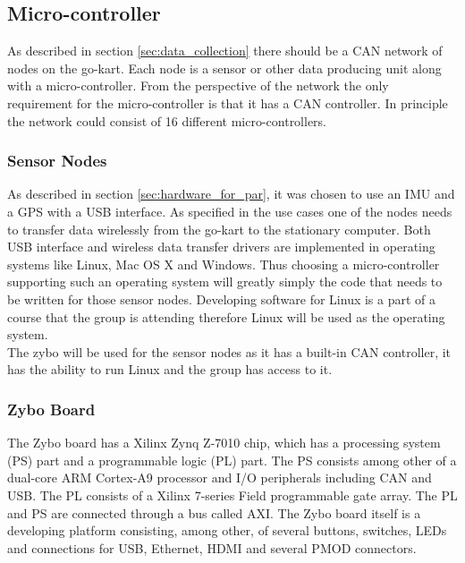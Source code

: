 
\subsection{Micro-controller}
As described in section \ref{sec:data_collection} there should be a CAN network of nodes on the go-kart.
Each node is a sensor or other data producing unit along with a micro-controller.
From the perspective of the network the only requirement for the micro-controller is that it has a CAN controller.
In principle the network could consist of 16 different micro-controllers.
\subsubsection*{Sensor Nodes}
As described in section \ref{sec:hardware_for_par}, it was chosen to use an IMU and a GPS with a USB interface. 
As specified in the use cases one of the nodes needs to transfer data wirelessly from the go-kart to the stationary computer. 
Both USB interface and wireless data transfer drivers are implemented in operating systems like Linux, Mac OS X and Windows.
Thus choosing a micro-controller supporting such an operating system will greatly simply the code that needs to be written for those sensor nodes.
Developing software for Linux is a part of a course that the group is attending therefore Linux will be used as the operating system.
\\
The \ac{zybo} will be used for the sensor nodes as it has a built-in CAN controller, it has the ability to run Linux and the group has access to it.

\subsubsection*{Zybo Board}
The Zybo board has a Xilinx Zynq Z-7010 chip, which has a processing system (PS) part and a programmable logic (PL) part.
The PS consists among other of a dual-core ARM Cortex-A9 processor and I/O peripherals including CAN and USB.
The PL consists of a Xilinx 7-series Field programmable gate array. 
The PL and PS are connected through a bus called AXI.
The Zybo board itself is a developing platform consisting, among other, of several buttons, switches, LEDs and connections for USB, Ethernet, HDMI and several PMOD connectors.


